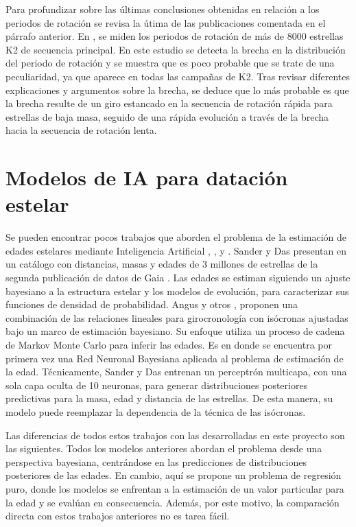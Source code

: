 Para profundizar sobre las últimas conclusiones obtenidas en relación a los periodos de rotación se revisa la útima de las publicaciones comentada en el párrafo anterior. En \cite{Gordon21}, se miden los periodos de rotación de más de 8000 estrellas K2 de secuencia principal. En este estudio se detecta la brecha en la distribución del periodo de rotación y se muestra que es poco probable que se trate de una peculiaridad, ya que aparece en todas las campañas de K2. Tras revisar diferentes explicaciones y argumentos sobre la brecha, se deduce que lo más probable es que la brecha resulte de un giro estancado en la secuencia de rotación rápida para estrellas de baja masa, seguido de una rápida evolución a través de la brecha hacia la secuencia de rotación lenta.


\section{Modelos de IA para datación estelar}
Se pueden encontrar pocos trabajos que aborden el problema de la estimación de edades estelares mediante Inteligencia Artificial \cite{stardate}, \cite{Angus19}, \cite{das2018} y \cite{sanders2018}. Sander y Das presentan en \cite{sanders2018} un catálogo con distancias, masas y edades de 3 millones de estrellas de la segunda publicación de datos de Gaia \cite{Gaia2018}. %
Las edades se estiman siguiendo un ajuste bayesiano a la estructura estelar y los modelos de evolución, para caracterizar sus funciones de densidad de probabilidad. Angus y otros \cite{stardate}, \cite{Angus19} proponen una combinación de las relaciones lineales para girocronología con isócronas ajustadas bajo un marco de estimación bayesiano. Su enfoque utiliza un proceso de cadena de Markov Monte Carlo para inferir las edades. Es en \cite{sanders2018} donde se encuentra por primera vez una Red Neuronal Bayesiana aplicada al problema de estimación de la edad. Técnicamente, Sander y Das \cite{sanders2018} entrenan un perceptrón multicapa, con una sola capa oculta de 10 neuronas, para generar distribuciones posteriores predictivas para la masa, edad y distancia de las estrellas. De esta manera, su modelo puede reemplazar la dependencia de la técnica de las isócronas. 

Las diferencias de todos estos trabajos con las desarrolladas en este proyecto son las siguientes. Todos los modelos anteriores abordan el problema desde una perspectiva bayesiana, centrándose en las predicciones de distribuciones posteriores de las edades. En cambio, aquí se propone un problema de regresión puro, donde los modelos se enfrentan a la estimación de un valor particular para la edad y se evalúan en consecuencia. Además, por este motivo, la comparación directa con estos trabajos anteriores no es tarea fácil.

